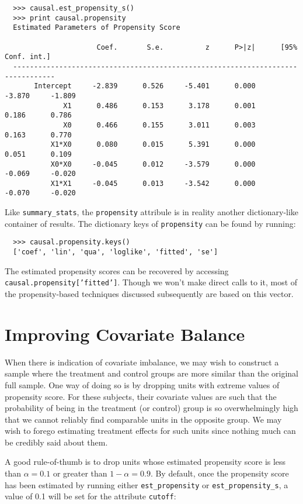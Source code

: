 \documentclass[12pt]{article}
\theoremstyle{definition}
\theoremstyle{definition}
\theoremstyle{definition}
\theoremstyle{remark}
\begin{document}
\begin{verbatim}
  >>> causal.est_propensity_s()
  >>> print causal.propensity
  Estimated Parameters of Propensity Score
  
                      Coef.       S.e.          z      P>|z|      [95% Conf. int.]
  --------------------------------------------------------------------------------
       Intercept     -2.839      0.526     -5.401      0.000     -3.870     -1.809
              X1      0.486      0.153      3.178      0.001      0.186      0.786
              X0      0.466      0.155      3.011      0.003      0.163      0.770
           X1*X0      0.080      0.015      5.391      0.000      0.051      0.109
           X0*X0     -0.045      0.012     -3.579      0.000     -0.069     -0.020
           X1*X1     -0.045      0.013     -3.542      0.000     -0.070     -0.020
\end{verbatim}

Like \texttt{summary\_stats}, the \texttt{propensity} attribule is in reality another dictionary-like container of results. The dictionary keys of \texttt{propensity} can be found by running:
\begin{verbatim}
  >>> causal.propensity.keys()
  ['coef', 'lin', 'qua', 'loglike', 'fitted', 'se']
\end{verbatim}
The estimated propensity scores can be recovered by accessing \texttt{causal.propensity['fitted']}. Though we won't make direct calls to it, most of the propensity-based techniques discussed subsequently are based on this vector.

\section*{Improving Covariate Balance}

When there is indication of covariate imbalance, we may wish to construct a sample where the treatment and control groups are more similar than the original full sample. One way of doing so is by dropping units with extreme values of propensity score. For these subjects, their covariate values are such that the probability of being in the treatment (or control) group is so overwhelmingly high that we cannot reliably find comparable units in the opposite group. We may wish to forego estimating treatment effects for such units since nothing much can be credibly said about them.

A good rule-of-thumb is to drop units whose estimated propensity score is less than $\alpha=0.1$ or greater than $1-\alpha=0.9$. By default, once the propensity score has been estimated by running either \texttt{est\_propensity} or \texttt{est\_propensity\_s}, a value of 0.1 will be set for the attribute \texttt{cutoff}:
\end{document}
